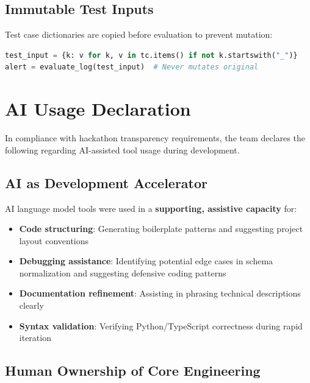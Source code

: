 \documentclass[12pt,a4paper]{article}
\begin{document}
\subsection{Immutable Test Inputs}

Test case dictionaries are copied before evaluation to prevent mutation:

\begin{lstlisting}[language=Python]
test_input = {k: v for k, v in tc.items() if not k.startswith("_")}
alert = evaluate_log(test_input)  # Never mutates original
\end{lstlisting}

\section{AI Usage Declaration}

In compliance with hackathon transparency requirements, the team declares the following regarding AI-assisted tool usage during development.

\subsection{AI as Development Accelerator}

AI language model tools were used in a \textbf{supporting, assistive capacity} for:

\begin{itemize}[noitemsep]
    \item \textbf{Code structuring}: Generating boilerplate patterns and suggesting project layout conventions
    \item \textbf{Debugging assistance}: Identifying potential edge cases in schema normalization and suggesting defensive coding patterns
    \item \textbf{Documentation refinement}: Assisting in phrasing technical descriptions clearly
    \item \textbf{Syntax validation}: Verifying Python/TypeScript correctness during rapid iteration
\end{itemize}

\subsection{Human Ownership of Core Engineering}
\end{document}
